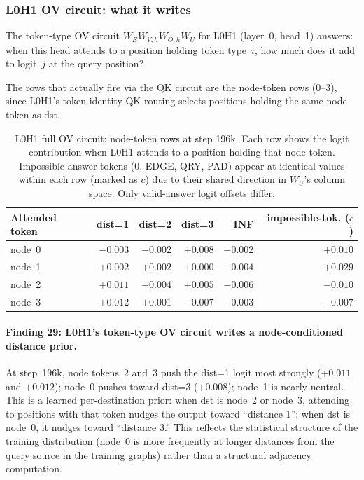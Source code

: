\documentclass[11pt, a4paper]{article}
\begin{document}
\subsubsection{L0H1 OV circuit: what it writes}
\label{sec:l0h1-ov}

The token-type OV circuit $W_E W_{V,h} W_{O,h} W_U$ for L0H1 (layer~0,
head~1) answers: when this head attends to a position holding token type~$i$,
how much does it add to logit~$j$ at the query position?

The rows that actually fire via the QK circuit are the node-token rows (0--3),
since L0H1's token-identity QK routing selects positions holding the same node
token as dst.

\begin{table}[H]
\centering
\caption{L0H1 full OV circuit: node-token rows at step 196k.  Each row shows
the logit contribution when L0H1 attends to a position holding that node
token.  Impossible-answer tokens (0, EDGE, QRY, PAD) appear at identical
values within each row (marked as $c$) due to their shared direction in
$W_U$'s column space.  Only valid-answer logit offsets differ.}
\label{tab:l0h1-ov}
\begin{tabular}{@{}lrrrrr@{}}
\toprule
Attended token & dist=1 & dist=2 & dist=3 & INF & impossible-tok. ($c$) \\
\midrule
node~0 & $-0.003$ & $-0.002$ & $\mathbf{+0.008}$ & $-0.002$ & $+0.010$ \\
node~1 & $+0.002$ & $+0.002$ & $+0.000$ & $-0.004$ & $+0.029$ \\
node~2 & $\mathbf{+0.011}$ & $-0.004$ & $+0.005$ & $-0.006$ & $-0.010$ \\
node~3 & $\mathbf{+0.012}$ & $+0.001$ & $-0.007$ & $-0.003$ & $-0.007$ \\
\bottomrule
\end{tabular}
\end{table}

\paragraph{Finding 29: L0H1's token-type OV circuit writes a node-conditioned
distance prior.}
At step~196k, node tokens~2 and~3 push the dist=1 logit most strongly
($+0.011$ and $+0.012$); node~0 pushes toward dist=3 ($+0.008$); node~1 is
nearly neutral.  This is a learned per-destination prior: when dst is node~2
or node~3, attending to positions with that token nudges the output toward
``distance 1''; when dst is node~0, it nudges toward ``distance 3.''  This
reflects the statistical structure of the training distribution (node~0 is
more frequently at longer distances from the query source in the training
graphs) rather than a structural adjacency computation.
\end{document}
